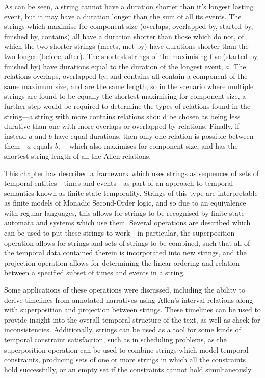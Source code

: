\documentclass[a4paper,12pt,leqno,twoside]{article}
\newcommand{\vph}[1]{\vphantom{#1}}
\newcommand{\ebox}[1]{\fbox{$\vph{'(),}#1$}}
\newcommand{\EventString}[1]{%
	\renewcommand*{\do}[1]{\ebox{##1}}%
	\PipeParser{#1}%
}
\begin{document}
As can be seen, a string cannot have a duration shorter than it's longest lasting event, but it may have a duration longer than the sum of all its events. The strings which maximise for component size (overlaps, overlapped by, started by, finished by, contains) all have a duration shorter than those which do not, of which the two shorter strings (meets, met by) have durations shorter than the two longer (before, after). The shortest strings of the maximising five (started by, finished by) have durations equal to the duration of the longest event, $a$. The relations overlaps, overlapped by, and contains all contain a component of the same maximum size, and are the same length, so in the scenario where multiple strings are found to be equally the shortest maximising for component size, a further step would be required to determine the types of relations found in the string---a string with more contains relations should be chosen as being less durative than one with more overlaps or overlapped by relations. Finally, if instead $a$ and $b$ have equal durations, then only one relation is possible between them---$a$ equals $b$, \EventString{{}|a,b|{}}---which also maximises for component size, and has the shortest string length of all the Allen relations.

This chapter has described a framework which uses strings as sequences of sets of temporal entities---times and events---as part of an approach to temporal semantics known as finite-state temporality. Strings of this type are interpretable as finite models of Monadic Second-Order logic, and so due to an equivalence with regular languages, this allows for strings to be recognised by finite-state automata and systems which use them. Several operations are described which can be used to put these strings to work---in particular, the superposition operation allows for strings and sets of strings to be combined, such that all of the temporal data contained therein is incorporated into new strings, and the projection operation allows for determining the linear ordering and relation between a specified subset of times and events in a string.

Some applications of these operations were discussed, including the ability to derive timelines from annotated narratives using Allen's interval relations along with superposition and projection between strings. These timelines can be used to provide insight into the overall temporal structure of the text, as well as check for inconsistencies.
Additionally, strings can be used as a tool for some kinds of temporal constraint satisfaction, such as in scheduling problems, as the superposition operation can be used to combine strings which model temporal constraints, producing sets of one or more strings in which all the constraints hold successfully, or an empty set if the constraints cannot hold simultaneously.
\end{document}
